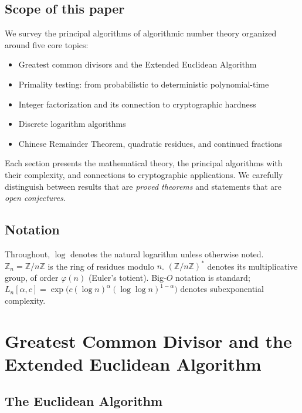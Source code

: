 \documentclass[12pt,a4paper]{amsart}
\theoremstyle{definition}
\begin{document}
\subsection*{Scope of this paper}

We survey the principal algorithms of algorithmic number theory organized
around five core topics:
\begin{itemize}[leftmargin=2em]
  \item Greatest common divisors and the Extended Euclidean Algorithm
  \item Primality testing: from probabilistic to deterministic polynomial-time
  \item Integer factorization and its connection to cryptographic hardness
  \item Discrete logarithm algorithms
  \item Chinese Remainder Theorem, quadratic residues, and continued fractions
\end{itemize}
Each section presents the mathematical theory, the principal algorithms with
their complexity, and connections to cryptographic applications. We carefully
distinguish between results that are \emph{proved theorems} and statements
that are \emph{open conjectures}.

\subsection*{Notation}

Throughout, $\log$ denotes the natural logarithm unless otherwise noted.
$\mathbb{Z}_n = \mathbb{Z}/n\mathbb{Z}$ is the ring of residues modulo $n$.
$(\mathbb{Z}/n\mathbb{Z})^*$ denotes its multiplicative group, of order
$\varphi(n)$ (Euler's totient). Big-$O$ notation is standard;
$L_n[\alpha, c] = \exp\!\bigl(c(\log n)^\alpha (\log\log n)^{1-\alpha}\bigr)$
denotes subexponential complexity.

\section{Greatest Common Divisor and the Extended Euclidean Algorithm}

\subsection{The Euclidean Algorithm}
\end{document}
